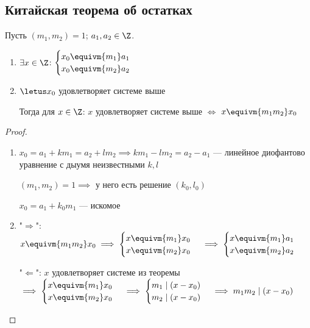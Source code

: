 \subsection{Китайская теорема об остатках}

\begin{theorem}
    Пусть $(m_1, m_2) = 1$; $a_1, a_2 \in \Z$.

    \begin{enumerate}
        \item $\exists x \in \Z$: 
        $\begin{cases}
            x_0 \equivm{m_1} a_1 \\
            x_0 \equivm{m_2} a_2
        \end{cases}$
        
        \item $\letus x_0$ удовлетворяет системе выше
        
        Тогда для $x \in \Z$: $x$ удовлетворяет системе выше $\iff$ $x \equivm{m_1 m_2} x_0$
    \end{enumerate}
\end{theorem}

\begin{proof}
    \begin{enumerate}
        \item $x_0 = a_1 + km_1 = a_2 + lm_2 \implies km_1 - lm_2 = a_2 - a_1$ --- линейное диофантово уравнение с дыумя неизвестными $k, l$
        
        $(m_1, m_2) = 1 \implies$ у него есть решение $(k_0, l_0)$
        
        $x_0 = a_1 + k_0 m_1$ --- искомое

        \item 
        
        "$\Rightarrow$":
        $x \equivm{m_1m_2} x_0 \implies 
        \begin {cases} 
            x \equivm{m_1} x_0 \\
            x \equivm{m_2} x_0
        \end{cases} \implies
        \begin{cases}
            x \equivm{m_1} a_1 \\
            x \equivm{m_2} a_2
        \end{cases}$

        "$\Leftarrow$":
        $x$ удовлетворяет системе из теоремы $\implies
        \begin {cases} 
            x \equivm{m_1} x_0 \\
            x \equivm{m_2} x_0
        \end{cases} \implies
        \begin{cases}
            m_1 \mid (x - x_0)\\
            m_2 \mid (x - x_0)
        \end{cases} \implies m_1m_2 \mid (x - x_0)$
    \end{enumerate}
\end{proof}

